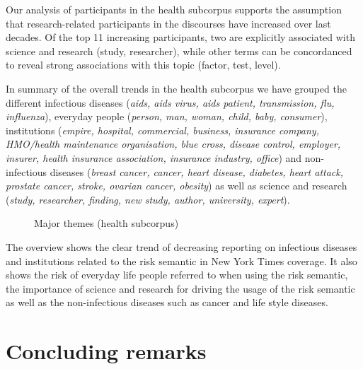 Our analysis of participants in the health subcorpus supports the assumption that research-related participants in the discourses have increased over last decades. Of the top 11 increasing participants, two are explicitly associated with science and research (study, researcher), while other terms can be concordanced to reveal strong associations with this topic (factor, test, level).

In summary of the overall trends in the health subcorpus we have grouped the different infectious diseases (\emph{aids, aids virus, aids patient, transmission, flu, influenza}), everyday people (\emph{person, man, woman, child, baby, consumer}), institutions (\emph{empire, hospital, commercial, business, insurance company, HMO\slash health maintenance organisation, blue cross, disease control, employer, insurer, health insurance association, insurance industry, office}) and non-infectious diseases (\emph{breast cancer, cancer, heart disease, diabetes, heart attack, prostate cancer, stroke, ovarian cancer, obesity}) as well as science and research (\emph{study, researcher, finding, new study, author, university, expert}).

\begin{figure}[htb!]
\centering
{}
\caption{Major themes (health subcorpus)}
\end{figure}

The overview shows the clear trend of decreasing reporting on infectious diseases and institutions related to the risk semantic in New York Times coverage. It also shows the risk of everyday life people referred to when using the risk semantic, the importance of science and research for driving the usage of the risk semantic as well as the non-infectious diseases such as cancer and life style diseases.

\section{Concluding remarks}

